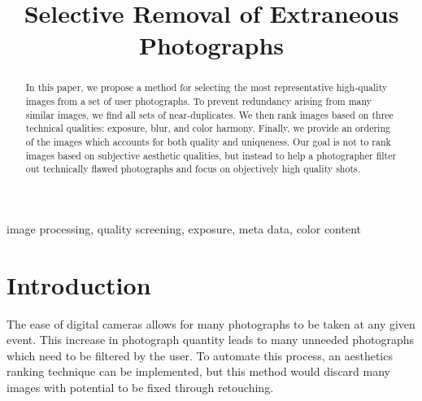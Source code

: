 \documentclass{article}
\begin{document}
\sloppy

\title{
Selective Removal of Extraneous Photographs
}

\address{[ksamii,acarlisl]@ucsc.edu,[uliana,davis]@soe.ucsc.edu}

\maketitle	
\begin{abstract}
In this paper, we propose a method for selecting the most representative high-quality images from a set of user photographs. To prevent redundancy arising from many similar images, we find all sets of near-duplicates. We then rank images based on three technical qualities: exposure, blur, and color harmony. Finally, we provide an ordering of the images which accounts for both quality and uniqueness. Our goal is not to rank images based on subjective aesthetic qualities, but instead to help a photographer filter out technically flawed photographs and focus on objectively high quality shots.
\end{abstract}	

\begin{keywords}
image processing, quality screening, exposure, meta data, color content  %
\end{keywords}

\section{Introduction}

The ease of digital cameras allows for many photographs to be taken at any given event. This increase in photograph quantity leads to many unneeded photographs which need to be filtered by the user. To automate this process, an aesthetics ranking technique can be implemented, but this method would discard many images with potential to be fixed through retouching.
\end{document}
